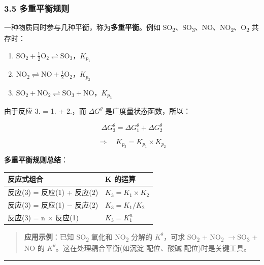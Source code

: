 \documentclass[a4paper,11pt]{ctexart}
\providecommand{\tightlist}{\setlength{\itemsep}{0pt}\setlength{\parskip}{0pt}}
\newcounter{none}
\newcommand{\箭}{\ensuremath{\rightarrow}}
\newcommand{\左箭}{\ensuremath{\leftarrow}}
\newcommand{\上箭}{\ensuremath{\uparrow}}
\newcommand{\下箭}{\ensuremath{\downarrow}}
\newcommand{\衡}{\ensuremath{\rightleftharpoons}}
\newcommand{\双箭}{\ensuremath{\leftrightarrow}}
\newcommand{\约等于}{\ensuremath{\approx}}
\newcommand{\小于等于}{\ensuremath{\leq}}
\newcommand{\大于等于}{\ensuremath{\geq}}
\newcommand{\不等于}{\ensuremath{\neq}}
\newcommand{\西格马}{\ensuremath{\sigma}}
\newcommand{\派}{\ensuremath{\pi}}
\begin{document}
\subsubsection{3.5 多重平衡规则}\label{ux591aux91cdux5e73ux8861ux89c4ux5219}

一种物质同时参与几种平衡，称为\textbf{多重平衡}。例如 SO\textsubscript{2}、SO\textsubscript{3}、NO、NO\textsubscript{2}、O\textsubscript{2} 共存时：

\begin{enumerate}
\def\labelenumi{\arabic{enumi}.}
\tightlist
\item
  \(\mathrm{SO_2 + \frac{1}{2}O_2 \rightleftharpoons SO_3}\)，\(K_{p_1}\)
\item
  \(\mathrm{NO_2 \rightleftharpoons NO + \frac{1}{2}O_2}\)，\(K_{p_2}\)
\item
  \(\mathrm{SO_2 + NO_2 \rightleftharpoons SO_3 + NO}\)，\(K_{p_3}\)
\end{enumerate}

由于反应 3. = 1. + 2.，而 \(\Delta G^\theta\) 是广度量状态函数，所以：

\[
\Delta G_3^\theta = \Delta G_1^\theta + \Delta G_2^\theta
\]

\[
\Rightarrow \quad \boxed{K_{p_3} = K_{p_1} \times K_{p_2}}
\]

\textbf{多重平衡规则总结}：

{\def\LTcaptype{none} %
\begin{longtable}[]{@{}ll@{}}
\toprule\noalign{}
反应式组合 & K 的运算 \\
\midrule\noalign{}
\endhead
\bottomrule\noalign{}
\endlastfoot
反应(3) = 反应(1) + 反应(2) & \(K_3 = K_1 \times K_2\) \\
反应(3) = 反应(1) − 反应(2) & \(K_3 = K_1 / K_2\) \\
反应(3) = n × 反应(1) & \(K_3 = K_1^n\) \\
\end{longtable}
}

\begin{quote}
\textbf{应用示例}：已知 SO\textsubscript{2} 氧化和 NO\textsubscript{2} 分解的 \(K^\theta\)，可求 SO\textsubscript{2} + NO\textsubscript{2} \箭 SO\textsubscript{3} + NO 的 \(K^\theta\)。这在处理耦合平衡(如沉淀-配位、酸碱-配位)时是关键工具。
\end{quote}

\begin{center}\rule{0.5\linewidth}{0.5pt}\end{center}
\end{document}

